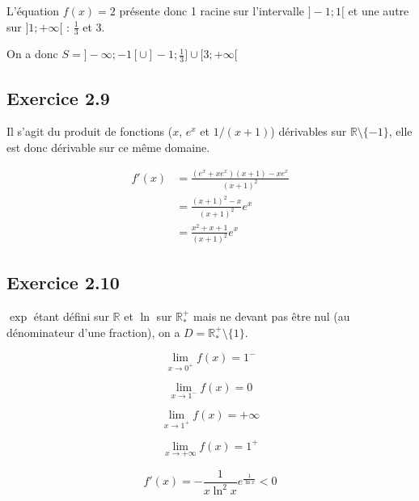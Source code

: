 \documentclass{report}
\begin{document}
L'équation $f(x)=2$ présente donc 1 racine sur l'intervalle $]-1 ; 1[$ et une autre sur $]1; +\infty[$ : $\frac{1}{3}$ et $3$.

On a donc $S = ]-\infty ; -1[ \cup ]-1 ; \frac{1}{3}] \cup [3 ; +\infty[$

\subsection*{Exercice 2.9}

Il s'agit du produit de fonctions ($x$, $e^x$ et $1/(x+1)$) dérivables sur $\mathbb{R}\setminus\{-1\}$,
elle est donc dérivable sur ce même domaine. 

\begin{equation*}
	\begin{split}
		f'(x) &= \frac{(e^x + x e^x)(x+1)-x e^x}{(x+1)^2} \\
		      &= \frac{(x+1)^2-x}{(x+1)^2}e^x \\
		      &= \frac{x^2 + x + 1}{(x+1)^2}e^x
	\end{split}
\end{equation*}

\subsection*{Exercice 2.10}

$\exp$ étant défini sur $\mathbb{R}$ et $\ln$ sur $\mathbb{R}^{+}_{*}$ mais ne devant pas être nul (au dénominateur d'une
fraction), on a $D = \mathbb{R}^{+}_{*}\setminus\{1\}$.

\begin{displaymath}
	\lim_{x \rightarrow 0^{+}} f(x) = 1^{-}
\end{displaymath}

\begin{displaymath}
	\lim_{x \rightarrow 1^{-}} f(x) = 0
\end{displaymath}

\begin{displaymath}
	\lim_{x \rightarrow 1^{+}} f(x) = +\infty
\end{displaymath}

\begin{displaymath}
	\lim_{x \rightarrow +\infty} f(x) = 1^{+}
\end{displaymath}

\begin{displaymath}
	f'(x) =-\frac{1}{x\ln^2 x} e^{\frac{1}{\ln x}} < 0
\end{displaymath}
\end{document}
